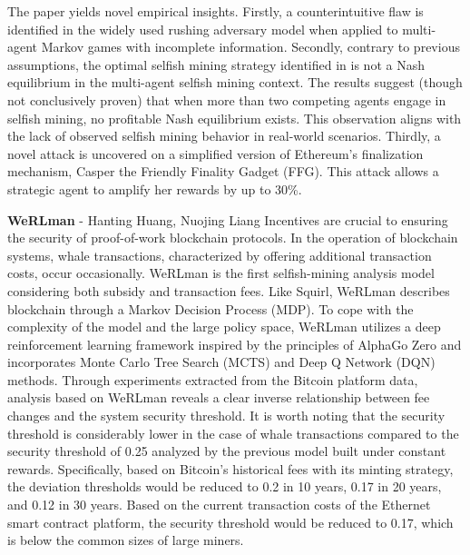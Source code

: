 The paper yields novel empirical insights. Firstly, a counterintuitive flaw is identified in the widely used rushing adversary model when applied to multi-agent Markov games with incomplete information.
Secondly, contrary to previous assumptions, the optimal selfish mining strategy identified in \cite{sapirshtein2016optimal} is not a Nash equilibrium in the multi-agent selfish mining context. The results suggest (though not conclusively proven) that when more than two competing agents engage in selfish mining, no profitable Nash equilibrium exists. This observation aligns with the lack of observed selfish mining behavior in real-world scenarios.
Thirdly, a novel attack is uncovered on a simplified version of Ethereum’s finalization mechanism, Casper the Friendly Finality Gadget (FFG). This attack allows a strategic agent to amplify her rewards by up to 30\%.


\textbf{WeRLman} - Hanting Huang, Nuojing Liang
Incentives are crucial to ensuring the security of proof-of-work blockchain protocols. In the operation of blockchain systems, whale transactions, characterized by offering additional transaction costs, occur occasionally. WeRLman is the first selfish-mining analysis model considering both subsidy and transaction fees\cite{bar2022werlman}. Like Squirl, WeRLman describes blockchain through a Markov Decision Process (MDP). To cope with the complexity of the model and the large policy space, WeRLman utilizes a deep reinforcement learning framework inspired by the principles of AlphaGo Zero and incorporates Monte Carlo Tree Search (MCTS) and Deep Q Network (DQN) methods. Through experiments extracted from the Bitcoin platform data, analysis based on WeRLman reveals a clear inverse relationship between fee changes and the system security threshold. It is worth noting that the security threshold is considerably lower in the case of whale transactions compared to the security threshold of 0.25 analyzed by the previous model built under constant rewards. Specifically, based on Bitcoin's historical fees with its minting strategy, the deviation thresholds would be reduced to 0.2 in 10 years, 0.17 in 20 years, and 0.12 in 30 years. Based on the current transaction costs of the Ethernet smart contract platform, the security threshold would be reduced to 0.17, which is below the common sizes of large miners.


